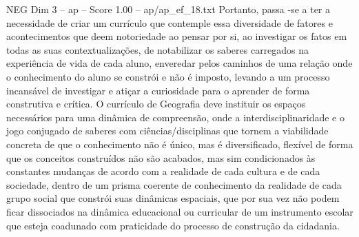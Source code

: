 \begin{textsample}{NEG Dim 3 – ap – Score 1.00 – ap/ap\_ef\_18.txt}
Portanto, passa -se a ter a necessidade de criar um currículo que contemple essa diversidade de fatores e acontecimentos que deem notoriedade ao pensar por si, ao investigar os fatos em todas as suas contextualizações, de notabilizar os saberes carregados na experiência de vida de cada aluno, enveredar pelos caminhos de uma relação onde o conhecimento do aluno se constrói e não é imposto, levando a um processo incansável de investigar e atiçar a curiosidade para o aprender de forma construtiva e crítica.
O currículo de Geografia deve instituir os espaços necessários para uma dinâmica de compreensão, onde a interdisciplinaridade e o jogo conjugado de saberes com ciências/disciplinas que tornem a viabilidade concreta de que o conhecimento não é único, mas é diversificado, flexível de forma que os conceitos construídos não são acabados, mas sim condicionados às constantes mudanças de acordo com a realidade de cada cultura e de cada sociedade, dentro de um prisma coerente de conhecimento da realidade de cada grupo social que constrói suas dinâmicas espaciais, que por sua vez não podem ficar dissociados na dinâmica educacional ou curricular de um instrumento escolar que esteja coadunado com praticidade do processo de construção da cidadania.

\end{textsample}
